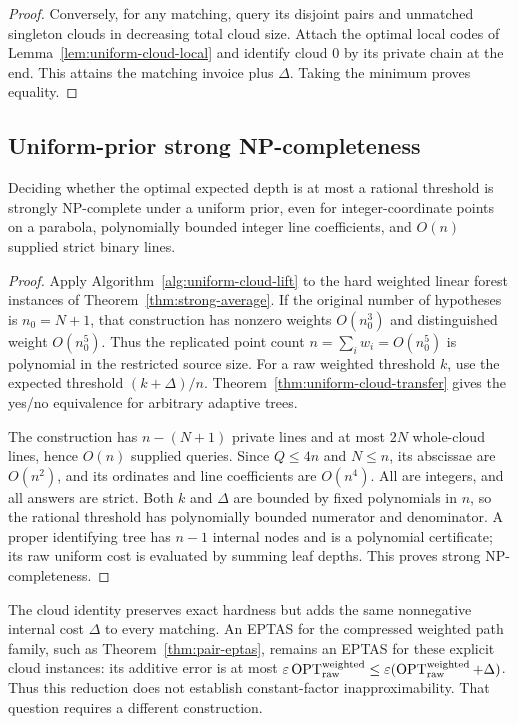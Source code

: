 \begin{proof}
Conversely, for any matching, query its disjoint pairs and
unmatched singleton clouds in decreasing total cloud size.
Attach the optimal local codes of
Lemma~\ref{lem:uniform-cloud-local} and identify cloud $0$ by
its private chain at the end. This attains the matching invoice
plus $\Delta$. Taking the minimum proves equality.
\end{proof}

\subsection{Uniform-prior strong NP-completeness}

\begin{theorem}\label{thm:strong-uniform-average}
Deciding whether the optimal expected depth is at most a rational
threshold is strongly NP-complete under a uniform prior, even for
integer-coordinate points on a parabola, polynomially bounded
integer line coefficients, and $O(n)$ supplied strict binary lines.
\end{theorem}
\begin{proof}
Apply Algorithm~\ref{alg:uniform-cloud-lift} to the hard weighted
linear forest instances of Theorem~\ref{thm:strong-average}.
If the original number of hypotheses is $n_0=N+1$, that
construction has nonzero weights $O(n_0^3)$ and distinguished
weight $O(n_0^5)$. Thus the replicated point count
$n=\sum_iw_i=O(n_0^5)$ is polynomial in the restricted source size.
For a raw weighted threshold $k$, use the expected threshold
$(k+\Delta)/n$. Theorem~\ref{thm:uniform-cloud-transfer} gives
the yes/no equivalence for arbitrary adaptive trees.

The construction has $n-(N+1)$ private lines and at most
$2N$ whole-cloud lines, hence $O(n)$ supplied queries.
Since $Q\le4n$ and $N\le n$, its abscissae are $O(n^2)$,
and its ordinates and line coefficients are $O(n^4)$.
All are integers, and all answers are strict.
Both $k$ and $\Delta$ are bounded by fixed polynomials in $n$,
so the rational threshold has polynomially bounded numerator
and denominator. A proper identifying tree has $n-1$ internal
nodes and is a polynomial certificate; its raw uniform cost
is evaluated by summing leaf depths. This proves strong
NP-completeness.

\end{proof}

\begin{remark}
The cloud identity preserves exact hardness but adds the same
nonnegative internal cost $\Delta$ to every matching. An EPTAS for
the compressed weighted path family, such as
Theorem~\ref{thm:pair-eptas}, remains an EPTAS for these explicit
cloud instances: its additive error is at most
$\varepsilon\operatorname{OPT}_{\rm raw}^{\rm weighted}\le
\varepsilon(\operatorname{OPT}_{\rm raw}^{\rm weighted}+\Delta)$.
Thus this reduction does not establish constant-factor
inapproximability. That question requires a different construction.
\end{remark}
